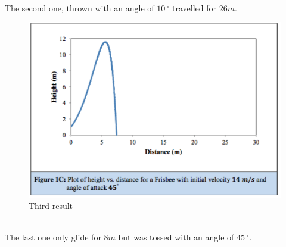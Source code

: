 \documentclass[10pt,a4paper]{report}
\begin{document}
\\The second one, thrown with an angle of $10\,^{\circ}$ travelled for $26m$.
\begin{figure}[!h]
\centering
\includegraphics[scale=0.6]{graph3.jpg}
\caption{Third result}
\label{Third result}
\end{figure}
\\The last one only glide for $8m$ but was tossed with an angle of $45\,^{\circ} $.
\end{document}
